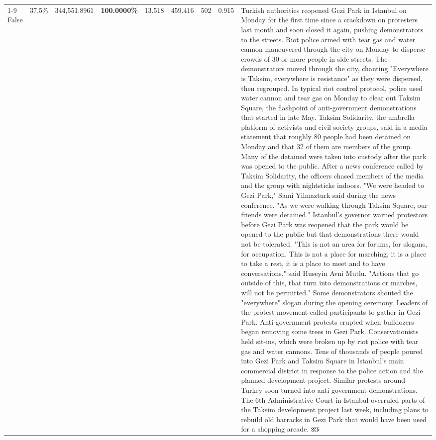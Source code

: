 \begin{table}[H]
\begin{tabular}{lllrlllll}
\cline{1-9}
False & 37.5\% & 344,551.8961 & \bfseries \color{red} 100.0000\% & 13.518 & 459.416 & 502 & 0.915 & Turkish authorities reopened Gezi Park in Istanbul on Monday for the first time since a crackdown on protesters last month and soon closed it again, pushing demonstrators to the streets. Riot police armed with tear gas and water cannon maneuvered through the city on Monday to disperse crowds of 30 or more people in side streets. The demonstrators moved through the city, chanting "Everywhere is Taksim, everywhere is resistance" as they were dispersed, then regrouped. In typical riot control protocol, police used water cannon and tear gas on Monday to clear out Taksim Square, the flashpoint of anti-government demonstrations that started in late May. Taksim Solidarity, the umbrella platform of activists and civil society groups, said in a media statement that roughly 80 people had been detained on Monday and that 32 of them are members of the group. Many of the detained were taken into custody after the park was opened to the public. After a news conference called by Taksim Solidarity, the officers chased members of the media and the group with nightsticks indoors. "We were headed to Gezi Park," Sami Yilmazturk said during the news conference. "As we were walking through Taksim Square, our friends were detained." Istanbul's governor warned protestors before Gezi Park was reopened that the park would be opened to the public but that demonstrations there would not be tolerated. "This is not an area for forums, for slogans, for occupation. This is not a place for marching, it is a place to take a rest, it is a place to meet and to have conversations," said Huseyin Avni Mutlu. "Actions that go outside of this, that turn into demonstrations or marches, will not be permitted." Some demonstrators shouted the "everywhere" slogan during the opening ceremony. Leaders of the protest movement called participants to gather in Gezi Park. Anti-government protests erupted when bulldozers began removing some trees in Gezi Park. Conservationists held sit-ins, which were broken up by riot police with tear gas and water cannons. Tens of thousands of people poured into Gezi Park and Taksim Square in Istanbul's main commercial district in response to the police action and the planned development project. Similar protests around Turkey soon turned into anti-government demonstrations. The 6th Administrative Court in Istanbul overruled parts of the Taksim development project last week, including plans to rebuild old barracks in Gezi Park that would have been used for a shopping arcade. প্রচে \\

\end{tabular}
\end{table}
